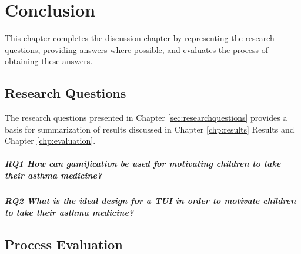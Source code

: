 \chapter{Conclusion}
\label{chp:masterconclusion}

This chapter completes the discussion chapter by representing the research questions, providing answers where possible, and evaluates the process of obtaining these answers. 

\section{Research Questions}

The research questions presented in Chapter \ref{sec:researchquestions} provides a basis for summarization of results discussed in Chapter \ref{chp:results} Results and Chapter \ref{chp:evaluation}. 

\paragraph{RQ1 How can gamification be used for motivating children to take their asthma medicine?}



\paragraph{RQ2 What is the ideal design for a TUI in order to motivate children to take their asthma medicine?}



\section{Process Evaluation}
